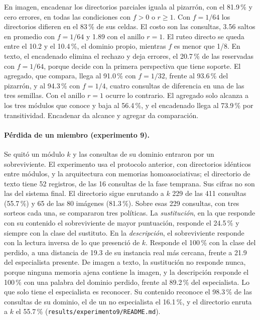 En imagen, encadenar los directorios parciales iguala al pizarrón, con el 81.9\,\% y
cero errores, en todas las condiciones con $f > 0$ o $r \geq 1$.
Con $f = 1/64$ los directorios difieren en el 83\,\% de sus celdas.
El costo son las consultas, 3.56 saltos en promedio con $f = 1/64$ y 1.89 con el
anillo $r = 1$.
El ruteo directo se queda entre el 10.2 y el 10.4\,\%, el dominio propio, mientras $f$
es menor que 1/8.
En texto, el encadenado elimina el rechazo y deja errores, el 20.7\,\% de las
reservadas con $f = 1/64$, porque decide con la primera perspectiva que tiene soporte.
El agregado, que compara, llega al 91.0\,\% con $f = 1/32$, frente al 93.6\,\% del
pizarrón, y al 94.3\,\% con $f = 1/4$, cuatro consultas de diferencia en una de las
tres semillas.
Con el anillo $r = 1$ ocurre lo contrario.
El agregado solo alcanza a los tres módulos que conoce y baja al 56.4\,\%, y el
encadenado llega al 73.9\,\% por transitividad.
Encadenar da alcance y agregar da comparación.

\paragraph{Pérdida de un miembro (experimento 9).}
Se quitó un módulo $k$ y las consultas de su dominio entraron por un sobreviviente.
El experimento usa el protocolo anterior, con directorios idénticos entre módulos, y la
arquitectura con memorias homoasociativas; el directorio de texto tiene 52 registros,
de las 16 consultas de la fase temprana.
Sus cifras no son las del sistema final.
El directorio sigue enrutando a $k$ 229 de las 411 consultas (55.7\,\%) y 65 de las 80
imágenes (81.3\,\%).
Sobre esas 229 consultas, con tres sorteos cada una, se compararon tres políticas.
La \emph{sustitución}, en la que responde con su contenido el sobreviviente de mayor
puntuación, responde el 24.5\,\% y siempre con la clase del sustituto.
En la \emph{descripción}, el sobreviviente responde con la lectura inversa de lo que
presenció de $k$.
Responde el 100\,\% con la clase del perdido, a una distancia de 19.3 de su instancia
real más cercana, frente a 21.9 del especialista presente.
De imagen a texto, la sustitución no responde nunca, porque ninguna memoria ajena
contiene la imagen, y la descripción responde el 100\,\% con una palabra del dominio
perdido, frente al 89.2\,\% del especialista.
Lo que solo tiene el especialista es reconocer.
Su contenido reconoce el 98.3\,\% de las consultas de su dominio, el de un no
especialista el 16.1\,\%, y el directorio enruta a $k$ el 55.7\,\%
(\texttt{results/experimento9/README.md}).

